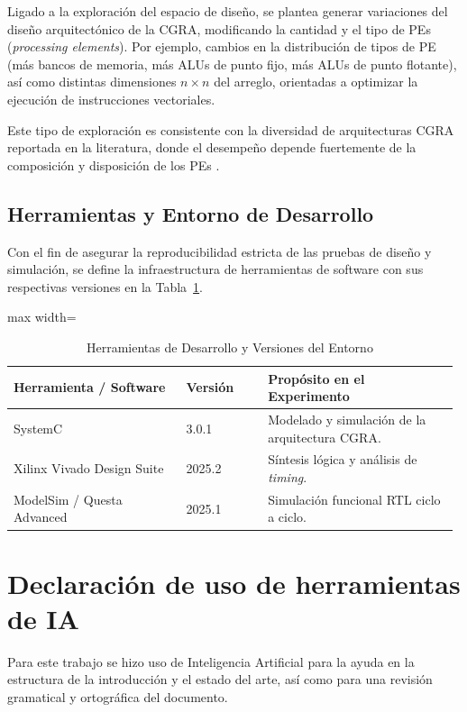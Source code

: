 \documentclass[conference]{IEEEtran}
\begin{document}
Ligado a la exploración del espacio de diseño, se plantea generar variaciones del diseño arquitectónico de la CGRA, modificando la cantidad y el tipo de PEs (\textit{processing elements}). Por ejemplo, cambios en la distribución de tipos de PE (más bancos de memoria, más ALUs de punto fijo, más ALUs de punto flotante), así como distintas dimensiones $n \times n$ del arreglo, orientadas a optimizar la ejecución de instrucciones vectoriales.

Este tipo de exploración es consistente con la diversidad de arquitecturas CGRA reportada en la literatura, donde el desempeño depende fuertemente de la composición y disposición de los PEs \cite{Podobas}.

\subsection{Herramientas y Entorno de Desarrollo}
Con el fin de asegurar la reproducibilidad estricta de las pruebas de diseño y simulación, se define la infraestructura de herramientas de software con sus respectivas versiones en la Tabla~\ref{tab:herramientas}.

\begin{table}[htbp]
\caption{Herramientas de Desarrollo y Versiones del Entorno}
\label{tab:herramientas}
\centering
\scriptsize
\begin{adjustbox}{max width=\columnwidth}
\begin{tabular}{@{}p{0.38\linewidth}p{0.18\linewidth}p{0.42\linewidth}@{}}
\toprule
\textbf{Herramienta / Software} & \textbf{Versión} & \textbf{Propósito en el Experimento} \\
\midrule
SystemC & 3.0.1 & Modelado y simulación de la arquitectura CGRA. \\
Xilinx Vivado Design Suite & 2025.2 & Síntesis lógica y análisis de \textit{timing}. \\
ModelSim / Questa Advanced & 2025.1 & Simulación funcional RTL ciclo a ciclo. \\
\bottomrule
\end{tabular}
\end{adjustbox}
\end{table}

\section*{Declaración de uso de herramientas de IA}
Para este trabajo se hizo uso de Inteligencia Artificial para la ayuda en la estructura de la introducción y el estado del arte, así como para una revisión gramatical y ortográfica del documento.




\end{document}
